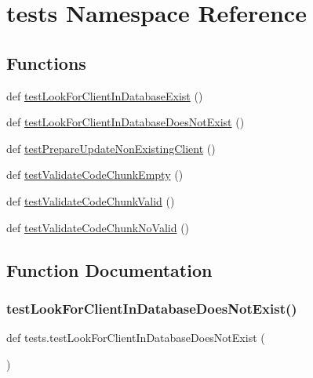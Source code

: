 \hypertarget{namespacetests}{}\section{tests Namespace Reference}
\label{namespacetests}
\subsection*{Functions}
\begin{DoxyCompactItemize}
\item 
def \hyperlink{namespacetests_ab9d8846c7694143044a37e86e9447600}{test\+Look\+For\+Client\+In\+Database\+Exist} ()
\item 
def \hyperlink{namespacetests_aa01c1b55c064d435f5ce63b79f8042a5}{test\+Look\+For\+Client\+In\+Database\+Does\+Not\+Exist} ()
\item 
def \hyperlink{namespacetests_a1305f09454544d106db05e825d2ae813}{test\+Prepare\+Update\+Non\+Existing\+Client} ()
\item 
def \hyperlink{namespacetests_a257095677e195c3499fa13fb7eb08a3e}{test\+Validate\+Code\+Chunk\+Empty} ()
\item 
def \hyperlink{namespacetests_a4d364f808ece8a89192b5fa6bd230906}{test\+Validate\+Code\+Chunk\+Valid} ()
\item 
def \hyperlink{namespacetests_a625a9a5cd2f728455da250e9ba37d457}{test\+Validate\+Code\+Chunk\+No\+Valid} ()
\end{DoxyCompactItemize}


\subsection{Function Documentation}
\mbox{\label{namespacetests_aa01c1b55c064d435f5ce63b79f8042a5}} 
\subsubsection{\texorpdfstring{test\+Look\+For\+Client\+In\+Database\+Does\+Not\+Exist()}{testLookForClientInDatabaseDoesNotExist()}}
{\footnotesize\ttfamily def tests.\+test\+Look\+For\+Client\+In\+Database\+Does\+Not\+Exist (\begin{DoxyParamCaption}{ }\end{DoxyParamCaption})}


